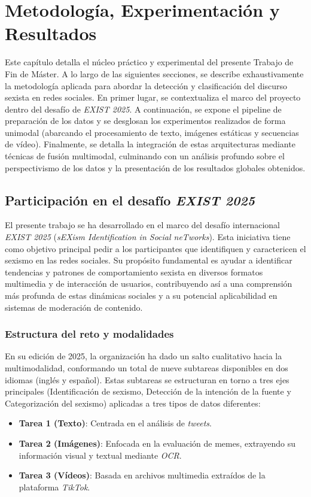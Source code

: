 \chapter{Metodología, Experimentación y Resultados}
\label{cap:Metodologia}
Este capítulo detalla el núcleo práctico y experimental del presente Trabajo de Fin de Máster. A lo largo de las siguientes secciones, se describe exhaustivamente la metodología aplicada para abordar la detección y clasificación del discurso sexista en redes sociales. En primer lugar, se contextualiza el marco del proyecto dentro del desafío de \textit{EXIST 2025}. A continuación, se expone el pipeline de preparación de los datos y se desglosan los experimentos realizados de forma unimodal (abarcando el procesamiento de texto, imágenes estáticas y secuencias de vídeo). Finalmente, se detalla la integración de estas arquitecturas mediante técnicas de fusión multimodal, culminando con un análisis profundo sobre el perspectivismo de los datos y la presentación de los resultados globales obtenidos. 

\section{Participación en el desafío \textit{EXIST 2025}}
\label{sec:ParticipacionDesafioEXIST2025}
El presente trabajo se ha desarrollado en el marco del desafío internacional \textit{EXIST 2025} (\textit{sEXism Identification in Social neTworks}). Esta iniciativa tiene como objetivo principal pedir a los participantes que identifiquen y caractericen el sexismo en las redes sociales. Su propósito fundamental es ayudar a identificar tendencias y patrones de comportamiento sexista en diversos formatos multimedia y de interacción de usuarios, contribuyendo así a una comprensión más profunda de estas dinámicas sociales y a su potencial aplicabilidad en sistemas de moderación de contenido. 

\subsection*{Estructura del reto y modalidades}
\label{subsec:EstructuraDelRetoYModalidades}
En su edición de 2025, la organización ha dado un salto cualitativo hacia la multimodalidad, conformando un total de nueve subtareas disponibles en dos idiomas (inglés y español). Estas subtareas se estructuran en torno a tres ejes principales (Identificación de sexismo, Detección de la intención de la fuente y Categorización del sexismo) aplicadas a tres tipos de datos diferentes:
\begin{itemize}
    \item \textbf{Tarea 1 (Texto)}: Centrada en el análisis de \textit{tweets}.
    \item \textbf{Tarea 2 (Imágenes)}: Enfocada en la evaluación de memes, extrayendo su información visual y textual mediante \textit{OCR}.
    \item \textbf{Tarea 3 (Vídeos)}: Basada en archivos multimedia extraídos de la plataforma \textit{TikTok}.
\end{itemize}

